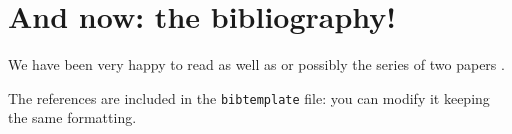 \documentclass[11pt,english]{smfart}
\begin{document}
\section{And now: the bibliography!}
We have been very happy to read \cite{GMP81} as well as \cite[Theorem~2.5]{BMM94} or possibly the series of two papers \cite{GS,GS82}.

The references are included in the \texttt{bibtemplate} file: you can modify it keeping the same formatting.

\end{document}
